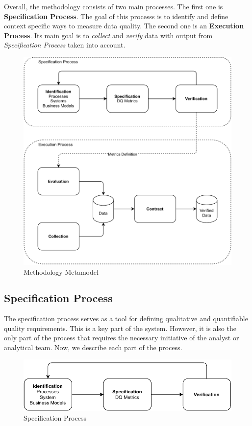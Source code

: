 Overall, the methodology consists of two main processes.
The first one is \textbf{Specification Process}.
The goal of this processs is to identify and define context specific ways to measure data quality.
The second one is an \textbf{Execution Process}.
Its main goal is to \textit{collect} and \textit{verify} data with output from \textit{Specification Process} taken into account.

\begin{figure}[htb]
    \centering
    \includegraphics[width=.8\textwidth]{figures/dq-methodology.pdf}
    \caption{Methodology Metamodel}
    \label{fig:methodology-metamodel}
\end{figure}
\FloatBarrier

\subsection{Specification Process}

The specification process serves as a tool for defining qualitative and quantifiable quality requirements.
This is a key part of the system.
However, it is also the only part of the process that requires the necessary initiative of the analyst or analytical team.
Now, we describe each part of the process.

\begin{figure}[htb]
    \centering
    \includegraphics[width=.8\textwidth]{figures/specification-process.pdf}
    \caption{Specification Process}
    \label{fig:specification-process}
\end{figure}
\FloatBarrier

